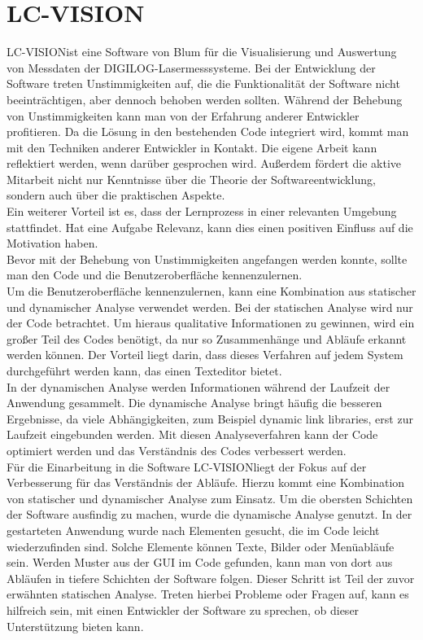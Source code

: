 \section{LC-VISION}
\glqq LC-VISION\grqq\space ist eine Software von \ac{Blum} für die Visualisierung und Auswertung von Messdaten der \glqq DIGILOG-Lasermesssysteme\grqq.
Bei der Entwicklung der Software treten Unstimmigkeiten auf, die die Funktionalität der Software nicht beeinträchtigen, aber dennoch behoben werden sollten.
Während der Behebung von Unstimmigkeiten kann man von der Erfahrung anderer Entwickler profitieren. Da die Lösung in den bestehenden Code integriert wird, kommt man mit den Techniken anderer Entwickler in Kontakt. Die eigene Arbeit kann reflektiert werden\cite{34908}, wenn darüber gesprochen wird. Außerdem fördert die aktive Mitarbeit nicht nur Kenntnisse über die Theorie der Softwareentwicklung, sondern auch über die praktischen Aspekte\cite{34908}.\\
Ein weiterer Vorteil ist es, dass der Lernprozess in einer relevanten Umgebung stattfindet\cite{34908}.
Hat eine Aufgabe Relevanz, kann dies einen positiven Einfluss auf die Motivation haben. \\
Bevor mit der Behebung von Unstimmigkeiten angefangen werden konnte, sollte man den Code und die Benutzeroberfläche kennenzulernen. \\
Um die Benutzeroberfläche kennenzulernen, kann eine Kombination aus statischer und dynamischer Analyse verwendet werden. Bei der statischen Analyse wird nur der Code betrachtet. Um hieraus qualitative Informationen zu gewinnen, wird ein großer Teil des Codes benötigt, da nur so Zusammenhänge und Abläufe erkannt werden können\cite{mock2003dynamic}. Der Vorteil liegt darin, dass dieses Verfahren auf jedem System durchgeführt werden kann, das einen Texteditor bietet. \\
In der dynamischen Analyse werden Informationen während der Laufzeit der Anwendung gesammelt. Die dynamische Analyse bringt häufig die besseren Ergebnisse, da viele Abhängigkeiten, zum Beispiel \glqq dynamic link libraries\grqq, erst zur Laufzeit eingebunden werden.
Mit diesen Analyseverfahren kann der Code optimiert werden und das Verständnis des Codes verbessert werden\cite{mock2003dynamic}.\\
Für die Einarbeitung in die Software \glqq LC-VISION\grqq\space liegt der Fokus auf der Verbesserung für das Verständnis der Abläufe. Hierzu kommt eine Kombination von statischer und dynamischer Analyse zum Einsatz. Um die obersten Schichten der Software ausfindig zu machen, wurde die dynamische Analyse genutzt. In der gestarteten Anwendung wurde nach Elementen gesucht, die im Code leicht wiederzufinden sind. Solche Elemente können Texte, Bilder oder Menüabläufe sein. Werden Muster aus der \ac{GUI} im Code gefunden, kann man von dort aus Abläufen in tiefere Schichten der Software folgen. Dieser Schritt ist Teil der zuvor erwähnten statischen Analyse. Treten hierbei Probleme oder Fragen auf, kann es hilfreich sein, mit einen Entwickler der Software zu sprechen, ob dieser Unterstützung bieten kann.\\
